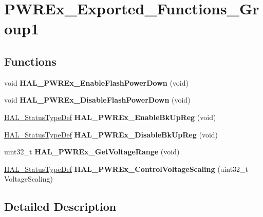 \hypertarget{group___p_w_r_ex___exported___functions___group1}{}\section{P\+W\+R\+Ex\+\_\+\+Exported\+\_\+\+Functions\+\_\+\+Group1}
\label{group___p_w_r_ex___exported___functions___group1}
\subsection*{Functions}
\begin{DoxyCompactItemize}
\item 
\mbox{\label{group___p_w_r_ex___exported___functions___group1_ga86c72a23f89c3c335ab784f42536b106}} 
void {\bfseries H\+A\+L\+\_\+\+P\+W\+R\+Ex\+\_\+\+Enable\+Flash\+Power\+Down} (void)
\item 
\mbox{\label{group___p_w_r_ex___exported___functions___group1_ga12385932ad48ece7fde94d5c3db5cd19}} 
void {\bfseries H\+A\+L\+\_\+\+P\+W\+R\+Ex\+\_\+\+Disable\+Flash\+Power\+Down} (void)
\item 
\mbox{\label{group___p_w_r_ex___exported___functions___group1_ga21165778ccc2144040c6a935c9f794a7}} 
\mbox{\hyperlink{stm32f4xx__hal__def_8h_a63c0679d1cb8b8c684fbb0632743478f}{H\+A\+L\+\_\+\+Status\+Type\+Def}} {\bfseries H\+A\+L\+\_\+\+P\+W\+R\+Ex\+\_\+\+Enable\+Bk\+Up\+Reg} (void)
\item 
\mbox{\label{group___p_w_r_ex___exported___functions___group1_gae1b50407389e3ce1132eceb013f823d1}} 
\mbox{\hyperlink{stm32f4xx__hal__def_8h_a63c0679d1cb8b8c684fbb0632743478f}{H\+A\+L\+\_\+\+Status\+Type\+Def}} {\bfseries H\+A\+L\+\_\+\+P\+W\+R\+Ex\+\_\+\+Disable\+Bk\+Up\+Reg} (void)
\item 
\mbox{\label{group___p_w_r_ex___exported___functions___group1_ga2978c7160c8d166f1bf2bf39e4bf33f7}} 
uint32\+\_\+t {\bfseries H\+A\+L\+\_\+\+P\+W\+R\+Ex\+\_\+\+Get\+Voltage\+Range} (void)
\item 
\mbox{\label{group___p_w_r_ex___exported___functions___group1_ga1a1e616641c2dc696681ace585d9afb5}} 
\mbox{\hyperlink{stm32f4xx__hal__def_8h_a63c0679d1cb8b8c684fbb0632743478f}{H\+A\+L\+\_\+\+Status\+Type\+Def}} {\bfseries H\+A\+L\+\_\+\+P\+W\+R\+Ex\+\_\+\+Control\+Voltage\+Scaling} (uint32\+\_\+t Voltage\+Scaling)
\end{DoxyCompactItemize}


\subsection{Detailed Description}
